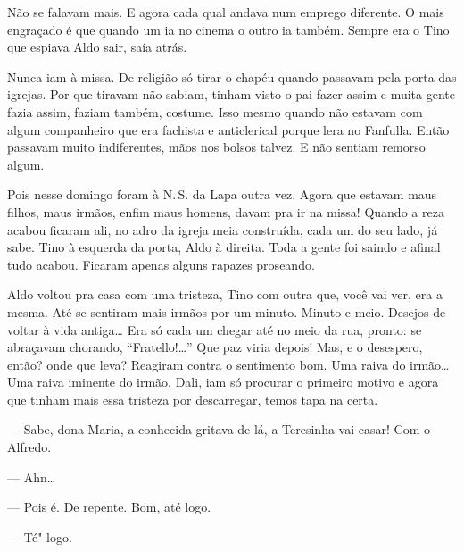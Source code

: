 Não se falavam mais. E agora cada qual andava num emprego diferente. O
mais engraçado é que quando um ia no cinema o outro ia também. Sempre
era o Tino que espiava Aldo sair, saía atrás.

Nunca iam à missa. De religião só tirar o chapéu quando passavam pela
porta das igrejas. Por que tiravam não sabiam, tinham visto o pai fazer
assim e muita gente fazia assim, faziam também, costume. Isso mesmo
quando não estavam com algum companheiro que era fachista e anticlerical
porque lera no Fanfulla. Então passavam muito indiferentes, mãos nos
bolsos talvez. E não sentiam remorso algum.

Pois nesse domingo foram à N.\,S. da Lapa outra vez. Agora que estavam
maus filhos, maus irmãos, enfim maus homens, davam pra ir na missa!
Quando a reza acabou ficaram ali, no adro da igreja meia construída,
cada um do seu lado, já sabe. Tino à esquerda da porta, Aldo à direita.
Toda a gente foi saindo e afinal tudo acabou. Ficaram apenas alguns
rapazes proseando.

Aldo voltou pra casa com uma tristeza, Tino com outra que, você vai ver,
era a mesma. Até se sentiram mais irmãos por um minuto. Minuto e meio.
Desejos de voltar à vida antiga\ldots{} Era só cada um chegar até no meio da
rua, pronto: se abraçavam chorando, ``Fratello!\ldots{}'' Que paz viria
depois! Mas, e o desespero, então? onde que leva? Reagiram contra o
sentimento bom. Uma raiva do irmão\ldots{} Uma raiva iminente do irmão. Dali,
iam só procurar o primeiro motivo e agora que tinham mais essa tristeza
por descarregar, temos tapa na certa.


--- Sabe, dona Maria, a conhecida gritava de lá, a Teresinha vai casar!
Com o Alfredo.

--- Ahn\ldots{}

--- Pois é. De repente. Bom, até logo.

--- Té"-logo.

